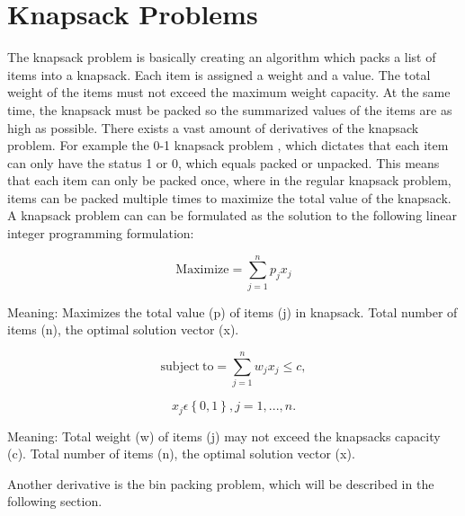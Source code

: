 \section{Knapsack Problems}
\label{sec:knapsack}
The knapsack problem is basically creating an algorithm which packs a list of items into a knapsack. Each item is assigned a weight and a value. The total weight of the items must not exceed the maximum weight capacity. At the same time, the knapsack must be packed so the summarized values of the items are as high as possible. There exists a vast amount of derivatives of the knapsack problem. For example the 0-1 knapsack problem \citep{knapsackproblems}, which dictates that each item can only have the status 1 or 0, which equals packed or unpacked. This means that each item can only be packed once, where in the regular knapsack problem, items can be packed multiple times to maximize the total value of the knapsack. A knapsack problem can can be formulated as the solution to the following linear integer programming formulation:


\begin{equation}
	\label{eq:maximize}
	\mathrm{Maximize} = \displaystyle\sum_{j=1}^{n} p_{j}x_{j}
\end{equation}

Meaning: Maximizes the total value (p) of items (j) in knapsack. Total number of items (n), the optimal solution vector (x).

\begin{equation}
	\label{eq:subjectto}
	\mathrm{subject~to} = \displaystyle\sum_{j=1}^{n} w_{j}x_{j}\leq c,
\end{equation}


\begin{equation}
	\label{eq:subset}
	x_{j}\displaystyle\epsilon\left\{ 0,1 \right \}, j=1,...,n.
\end{equation}

Meaning: Total weight (w) of items (j) may not exceed the knapsacks capacity (c). Total number of items (n), the optimal solution vector (x).

\citep{knapsackproblems}
\newline
Another derivative is the bin packing problem, which will be described in the following section.
